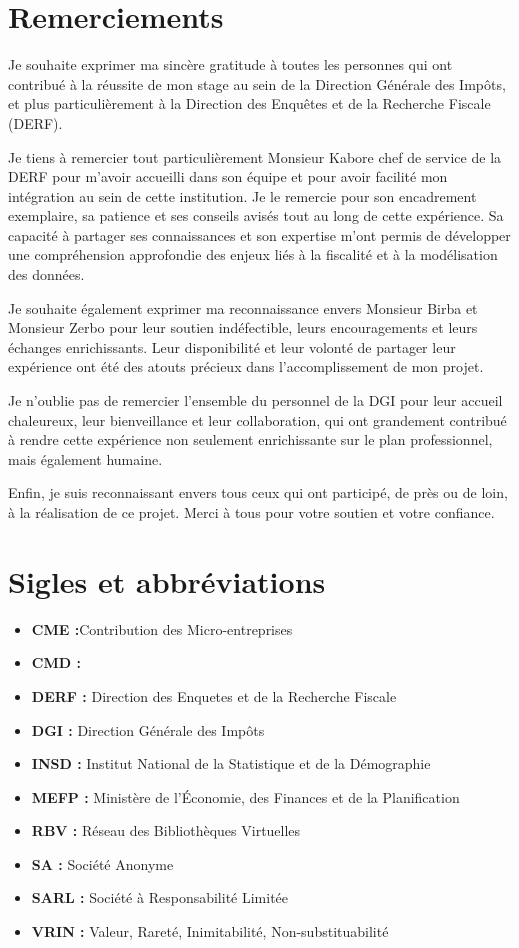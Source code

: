 \documentclass[a4paper,12pt]{report}
\begin{document}
\chapter*{Remerciements}

Je souhaite exprimer ma sincère gratitude à toutes les personnes qui ont contribué à la réussite de mon stage au sein de la Direction Générale des Impôts, et plus particulièrement à la Direction des Enquêtes et de la Recherche Fiscale (DERF).

Je tiens à remercier tout particulièrement Monsieur Kabore chef de service de la DERF pour m'avoir accueilli dans son équipe et pour avoir facilité mon intégration au sein de cette institution.
Je le remercie pour son encadrement exemplaire, sa patience et ses conseils avisés tout au long de cette expérience. Sa capacité à partager ses connaissances et son expertise m'ont permis de développer une compréhension approfondie des enjeux liés à la fiscalité et à la modélisation des données.

Je souhaite également exprimer ma reconnaissance envers Monsieur Birba et Monsieur Zerbo pour leur soutien indéfectible, leurs encouragements et leurs échanges enrichissants. Leur disponibilité et leur volonté de partager leur expérience ont été des atouts précieux dans l'accomplissement de mon projet.
 

Je n'oublie pas de remercier l'ensemble du personnel de la DGI pour leur accueil chaleureux, leur bienveillance et leur collaboration, qui ont grandement contribué à rendre cette expérience non seulement enrichissante sur le plan professionnel, mais également humaine.

Enfin, je suis reconnaissant envers tous ceux qui ont participé, de près ou de loin, à la réalisation de ce projet. Merci à tous pour votre soutien et votre confiance.

\chapter*{Sigles et abbréviations}
\begin{itemize}
\item \textbf{CME :}Contribution des Micro-entreprises
\item \textbf{CMD :} 
\item \textbf{DERF :} Direction des Enquetes et de la Recherche Fiscale
\item \textbf{DGI :} Direction Générale des Impôts
\item \textbf{INSD :} Institut National de la Statistique et de la Démographie
\item \textbf{MEFP :} Ministère de l'Économie, des Finances et de la Planification
\item \textbf{RBV :} Réseau des Bibliothèques Virtuelles
\item \textbf{SA :} Société Anonyme
\item \textbf{SARL :} Société à Responsabilité Limitée
\item \textbf{VRIN :} Valeur, Rareté, Inimitabilité, Non-substituabilité
\end{itemize}
\end{document}
